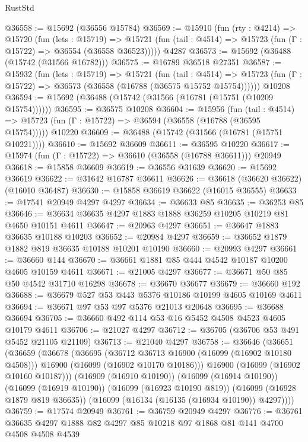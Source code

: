 \begin{lexlean}{RustStd}
\begin{coremodule}
@36558 := @15692 (@36556 @15784)
@36569 := @15910
    (fun (rty : @4214) =>
    @15720
      (fun (lets : @15719) =>
      @15721 (fun (tail : @4514) => @15723 (fun (Γ : @15722) => @36554 (@36558 @36523)))))
    @4287
@36573 := @15692 (@36488 (@15742 (@31566 @16782)))
@36575 := @16789 @36518 @27351
@36587 := @15932
    (fun (lets : @15719) =>
    @15721
      (fun (tail : @4514) =>
      @15723 (fun (Γ : @15722) => @36573 (@36558 (@16788 (@36575 @15752 @15754))))))
    @10208
@36594 := @15692 (@36488 (@15742 (@31566 (@16781 (@15751 (@10209 @15754))))))
@36595 := @36575 @10208
@36604 := @15956
    (fun (tail : @4514) => @15723 (fun (Γ : @15722) => @36594 (@36558 (@16788 (@36595 @15754)))))
    @10220
@36609 := @36488 (@15742 (@31566 (@16781 (@15751 @10221))))
@36610 := @15692 @36609
@36611 := @36595 @10220
@36617 := @15974 (fun (Γ : @15722) => @36610 (@36558 (@16788 @36611))) @20949
@36618 := @15858 @36609
@36619 := @36556 @31639
@36620 := @15692 @36619
@36622 := @31642 @16787 @36611
@36626 := @36618 (@36620 @36622) (@16010 @36487)
@36630 := @15858 @36619 @36622 (@16015 @36555)
@36633 := @17541 @20949 @4297 @4297
@36634 := @36633 @85
@36635 := @36253 @85
@36646 := @36634 @36635 @4297 @1883 @1888 @36259 @10205 @10219 @81 @4650 @10151 @4611
@36647 := @20963 @4297
@36651 := @36647 @1883 @36635 @10188 @10203
@36652 := @20984 @4297
@36659 := @36652 @1879 @1882 @819 @36635 @10188 @10201 @10190
@36660 := @20993 @4297
@36661 := @36660 @144
@36670 := @36661 @1881 @85 @444 @4542 @10187 @10200 @4605 @10159 @4611
@36671 := @21005 @4297
@36677 := @36671 @50 @85 @50 @4542 @31710 @16298
@36678 := @36670 @36677
@36679 := @36660 @192
@36688 := @36679 @527 @53 @443 @5376 @10186 @10199 @4605 @10169 @4611
@36694 := @36671 @97 @53 @97 @5376 @21013 @20648
@36695 := @36688 @36694
@36705 := @36660 @492 @114 @53 @16 @5452 @4508 @4523 @4605 @10179 @4611
@36706 := @21027 @4297
@36712 := @36705 (@36706 @53 @491 @5452 @21105 @21109)
@36713 := @21040 @4297
@36758 := @36646
    (@36651
      (@36659
        (@36678
          (@36695
            (@36712 @36713 @16900 (@16099 (@16902 @10180 @4508)))
            @16900
            (@16099 (@16902 @10170 @10186)))
          @16900
          (@16099 (@16902 @10160 @10187)))
        (@16909 (@16910 @10190))
        (@16099 (@16914 @10190))
        (@16099 (@16919 @10190))
        (@16099 (@16923 @10190 @819))
        (@16099 (@16928 @1879 @819 @36635))
        (@16099 (@16134 (@16135 (@16934 @10190)) @4297))))
@36759 := @17574 @20949
@36761 := @36759 @20949 @4297
@36776 := @36761 @36635 @4297 @1888 @82 @4297 @85 @10218 @97 @1868 @81 @141 @4700 @4508 @4508 @4539

\end{coremodule}
\end{lexlean}

